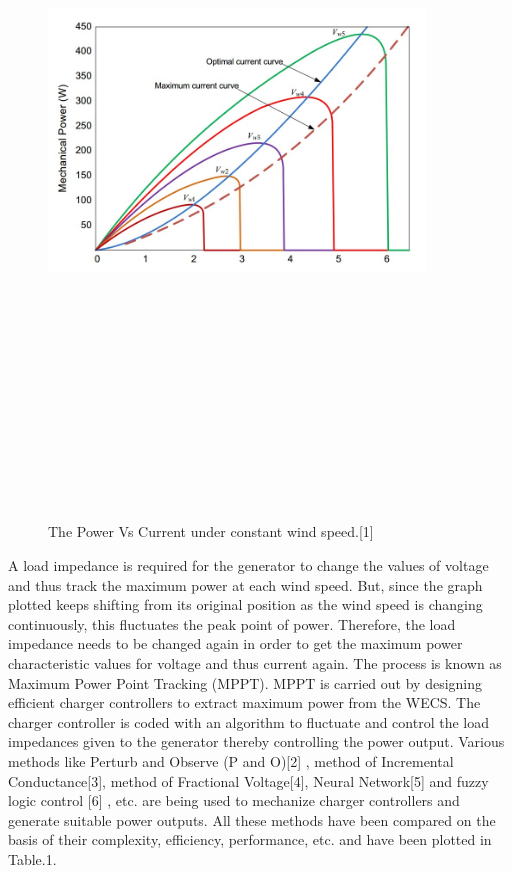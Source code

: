 \begin{center}
\begin{figure}
\includegraphics[width=10cm,height=20cm,keepaspectratio]{1.png}
\caption{The Power Vs Current under constant wind speed.[1]}
\label{Fig:1}    
\end{figure}

\end{center}
A load impedance is required for the generator to change the values of voltage and thus track the maximum power at each wind speed. But, since the graph plotted keeps shifting from its original position as the wind speed is changing continuously, this fluctuates the peak point of power. Therefore, the load impedance needs to be changed again in order to get the maximum power characteristic values for voltage and thus current again. The process is known as Maximum Power Point Tracking (MPPT).
MPPT is carried out by designing efficient charger controllers to extract maximum power from the WECS. The charger controller is coded with an algorithm to fluctuate and control the load impedances given to the generator thereby controlling the power output. Various methods like Perturb and Observe (P and O)[2] , method of Incremental Conductance[3], method of Fractional Voltage[4], Neural Network[5] and fuzzy logic control [6] , etc. are being used to mechanize charger controllers and generate suitable power outputs. All these methods have been compared on the basis of their complexity, efficiency, performance, etc. and have been plotted in Table.1.


